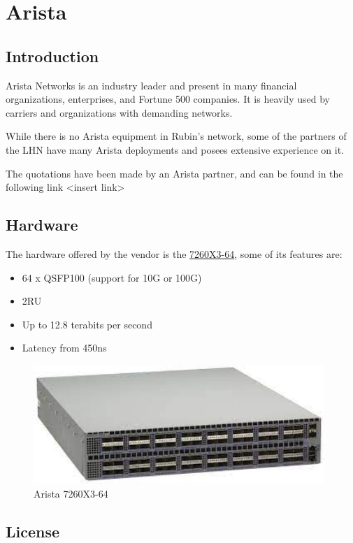 \section{Arista}

\subsection{Introduction}

Arista Networks is an industry leader and present in many financial organizations, enterprises, and Fortune 500 companies. It is heavily used by carriers and organizations with demanding networks. 

While there is no Arista equipment in Rubin's network, some of the partners of the LHN have many Arista deployments and posees extensive experience on it. 

The quotations have been made by an Arista partner, and can be found in the following link <insert link>

\subsection{Hardware}

The hardware offered by the vendor is the \href{https://www.arista.com/assets/data/pdf/Datasheets/7260X3_Datasheet.pdf}{7260X3-64}, some of its features are:
\begin{itemize}
    \item 64 x QSFP100 (support for 10G or 100G)
    \item 2RU
    \item Up to 12.8 terabits per second
    \item Latency from 450ns
\end{itemize}

\begin{figure}
    \includegraphics[width=11cm]{images/arista_7260X3-64.jpg}
    \centering
    \caption{Arista 7260X3-64}
  \end{figure}

\subsection{License}

